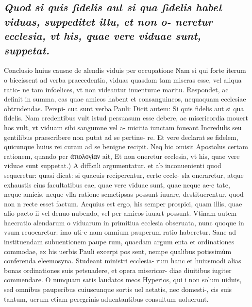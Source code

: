 \documentclass{article}
\begin{document}
\begin{pages}
\subsection*{\textit{Quod si quis fidelis aut si qua fidelis habet viduas, suppeditet illu, et non o- neretur ecclesia, vt his, quae vere viduae sunt, suppetat. }}\pstart Conclusio huius causae de alendis viduis per occupatione Nam si qui forte iterum o biecissent ad verba praecedentia, viduas quasdam tam miseras esse, vel aliqua ratio- ne tam infoelices, vt non videantur inuenturae maritu. Respondet, ac definit in summa, eas quae amicos habent et consanguineos, nequaquam ecclesiae obtrudendas. Perspi- cua sunt verba Pauli: Dicit autem: Si quis fidelis aut si qua fidelis. Nam credentibus vult istud persuasum esse debere, ac misericordia mouert hos vult, vt viduam sibi sangumne vel a- micitia iunctam foueant Incredulis seu gentilibus praescribere non putat ad se pertine- re. Et vere declarat se fidelem, quicunque huius rei curam ad se benigne recipit. Neq hic omisit Apostolus certam rationem, quando per ἀτιολογίαν ait,  \pend\pstart Et non oneretur ecclesia, vt his, quae vere viduae sunt suppetat.) A difficili argumentatur. et ab inconuenienti quod sequeretur: quasi dicat: si quaeuis reciperentur, certe eccle- sla oneraretur, atque exhaustis eius facultatibus eae, quae vere viduae sunt, quae neque ae-e tate, neque amicis, neque vlla ratione semetipsas possunt iuuare, destituerentur, quod non n recte esset factum. Aequius est ergo, his semper prospici, quam illis, quae alio pacto ii vel denuo nubendo, vel per amicos iuuart possunt. Vtinam autem haecratio alendarum o viduarum in primitiua ecclesia obseruata, nunc quoque in vsum reuocaretur: imo uti-e nam omnium pauperum ratio haberetur. Sane ad instituendam subuentionem paupe rum, quaedam argum enta et ordinationes commodae, ex his uerbis Pauli excerpi pos sent, nempe qualibus potissimùm conferenda eleemosyna. Studeant ministri ecclesia- rum hanc et huiusmodi alias bonas ordinationes suis petsuadere, et opera misericor- diae diuitibus iugiter commendare. O nunquam satis laudatos meos Hyperios, qui i non solum uiduis, sed omnibus pauperibus cuiuscunque sortis uel aetatis, nec domesti-, cis suis tantum, uerum etiam peregrinis aduentantibus consultum uoluerunt.  \pend
{}
{}

\end{pages}
\end{document}

